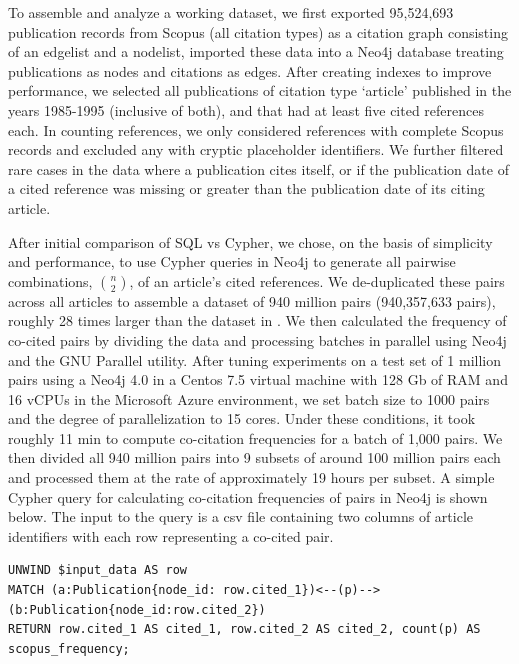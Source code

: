 \documentclass[utf8]{frontiersSCNS}
\begin{document}
To assemble and analyze a working dataset, we first exported 95,524,693 publication records from Scopus (all citation types) as a citation graph consisting of an edgelist and a nodelist, imported these data into a Neo4j database treating publications as nodes and citations as edges. After creating indexes to improve performance, we selected all publications of citation type `article' published in the years 1985-1995 (inclusive of both), and that had at least five cited references each. In counting references, we only considered references with complete Scopus records and excluded any with cryptic placeholder identifiers. We further filtered rare cases in the data where a publication cites itself, or if the publication date of a cited reference was missing or greater than the publication date of its citing article. 

After initial comparison of SQL vs Cypher, we chose, on the basis of simplicity and performance, to use Cypher queries in Neo4j to generate all pairwise combinations, $n\choose 2$, of an article's cited references. We de-duplicated these pairs across all articles to assemble a dataset of 940 million pairs (940,357,633 pairs), roughly 28 times larger than the dataset in \cite{devarakonda_2020}. We then calculated the frequency of co-cited pairs by dividing the data and processing batches in parallel using Neo4j and the GNU Parallel utility.  After tuning experiments on a test set of 1 million pairs using a Neo4j 4.0 in a Centos 7.5 virtual machine with 128 Gb of RAM and 16 vCPUs in the Microsoft Azure environment, we set batch size to 1000 pairs and the degree of parallelization to 15 cores. Under these conditions, it took roughly 11 min to compute co-citation frequencies for a batch of 1,000 pairs. We then divided all 940 million pairs into 9 subsets of around 100 million pairs each and processed them at the rate of approximately 19 hours per subset.  A simple Cypher query for calculating co-citation frequencies of pairs in Neo4j is shown below. The input to the query is a csv file containing two columns of article identifiers with each row representing a co-cited pair.  

\lstset{language=Pascal, basicstyle=\footnotesize} 
\begin{lstlisting}[frame=single]
UNWIND $input_data AS row
MATCH (a:Publication{node_id: row.cited_1})<--(p)-->(b:Publication{node_id:row.cited_2})
RETURN row.cited_1 AS cited_1, row.cited_2 AS cited_2, count(p) AS scopus_frequency;
\end{lstlisting}
\end{document}
